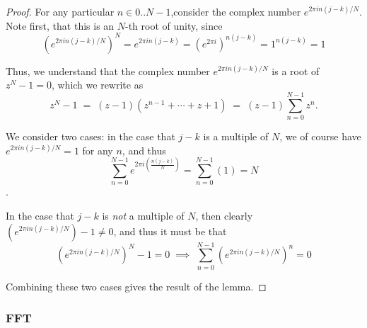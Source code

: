 		\begin{proof}
		
		For any particular $n \in 0..N-1$,consider the complex number $e^{2\pi i n(j-k)/N}$. Note first, that this is an $N$-th root of unity, since
		\[
		\left(e^{2\pi i n(j-k)/N}\right)^N = e^{2\pi i n(j-k)} = \left(e^{2\pi i}\right)^{n(j-k)}
		= 1^{n(j-k)} = 1
		\]
	
	Thus, we understand that the complex number $e^{2\pi i n(j-k)/N}$ is a root of $z^N -1 = 0$, which we rewrite as
	\[ z^N -1 \;=\; (z-1)(z^{n-1} + \cdots + z + 1) \;=\; (z-1)\sum_{n=0}^{N-1} z^n .
	\]

We consider two cases: in the case that $j-k$ is a multiple of $N$, we of course have $e^{2\pi i n(j-k)/N} = 1$ for any $n$, and thus
\[
\sum_{n=0}^{N-1} e^{2\pi i\left(\frac{n(j-k)}{N}\right)} = \sum_{n=0}^{N-1} \left(1\right) = N
\].

In the case that $j-k$ is \textit{not} a multiple of $N$, then clearly $\left(e^{2\pi i n(j-k)/N}\right)-1 \ne 0$, and thus it must be that
\[\left(e^{2\pi i n(j-k)/N}\right)^N -1 = 0 \;\implies\; \sum_{n=0}^{N-1} \left(e^{2\pi i n(j-k)/N}\right)^n = 0\]
	
	Combining these two cases gives the result of the lemma.
		\end{proof}
%		
		
		
		
		\subsubsection{FFT}
		
